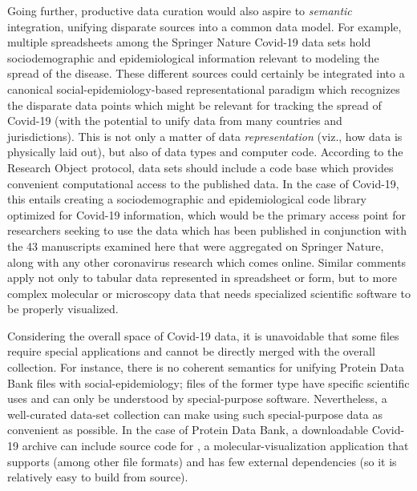 \documentclass[11pt,letterpaper]{article}
\newcommand{\IQmol}{\resizebox{!}{7.5pt}{\AcronymText{IQmol}}}
\newcommand{\textscc}[1]{{\color{orr!35!black}{{%
						\fontfamily{Cabin-TLF}\fontseries{b}\selectfont{\textsc{\scriptsize{#1}}}}}}}
\newcommand{\AcronymText}[1]{{\textscc{#1}}}
\newcommand{\CSV}{{\resizebox{!}{7.5pt}{\AcronymText{CSV}}}}
\newcommand{\PDB}{{\resizebox{!}{7.5pt}{\AcronymText{PDB}}}}
\newcommand{\p}[1]{

\vspace{.85em}#1}
\begin{document}
{\p{Going further, productive data curation would also 
aspire to \textit{semantic} integration, unifying disparate 
sources into a common data model.  For example, multiple 
spreadsheets among the Springer Nature Covid-19 data sets 
hold sociodemographic and epidemiological information relevant 
to modeling the spread of the disease.  These different 
sources could certainly be integrated into a canonical 
social-epidemiology-based representational paradigm which 
recognizes the disparate data points which might be 
relevant for tracking the spread of Covid-19 (with the 
potential to unify data from many countries and 
jurisdictions).  This is not only a matter of data
\textit{representation} (viz., how data is physically 
laid out), but also of data types and computer code.  
According to the Research Object protocol, 
data sets should include a code base 
which provides convenient computational access to the 
published data.  In the case of Covid-19, this entails 
creating a sociodemographic and epidemiological code 
library optimized for Covid-19 information, which would 
be the primary access point for researchers seeking to 
use the data which has been published in conjunction with 
the 43 manuscripts examined here that were aggregated 
on Springer Nature, along with any other coronavirus 
research which comes online.  Similar comments 
apply not only to tabular data represented in spreadsheet 
or \CSV{} form, but to more complex molecular or 
microscopy data that needs specialized scientific software 
to be properly visualized.}

\p{Considering the overall space of Covid-19 data, it is 
unavoidable that some files require special applications 
and cannot be directly merged with the overall collection.  
For instance, there is no coherent semantics for 
unifying Protein Data Bank files with social-epidemiology; 
files of the former type have specific scientific uses and 
can only be understood by special-purpose software.  
Nevertheless, a well-curated data-set collection can 
make using such special-purpose data as convenient as 
possible.  In the case of Protein Data Bank, a downloadable 
Covid-19 archive can include source code for \IQmol{}, a 
molecular-visualization application that supports 
\PDB{} (among other file formats) and has few 
external dependencies (so it is relatively easy to 
build from source).}  

}
\end{document}
